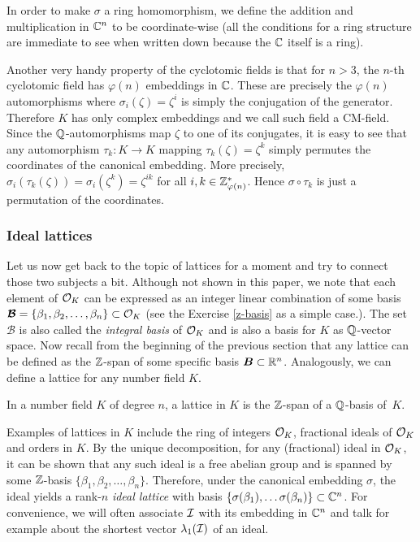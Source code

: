 In order to make $\sigma$ a ring homomorphism, we define the addition and multiplication in $\mathbb{C}^n$ to be coordinate-wise (all the conditions for a ring structure are immediate to see when written down because the $\mathbb{C}$ itself is a ring).

Another very handy property of the cyclotomic fields is that for $n > 3$, the $n$-th cyclotomic field has $\varphi(n)$ embeddings in $\mathbb{C}$. These are precisely the $\varphi(n)$ automorphisms where $\sigma_i(\zeta) = \zeta^i$ is simply the conjugation of the generator. Therefore $K$ has only complex embeddings and we call such field a CM-field. Since the $\mathbb{Q}$-automorphisms map $\zeta$ to one of its conjugates, it is easy to see that any automorphism $\tau_k : K \rightarrow K$ mapping $\tau_k(\zeta) = \zeta^k$ simply permutes the coordinates of the canonical embedding. More precisely, $\sigma_i(\tau_k(\zeta)) = \sigma_i(\zeta^k) = \zeta^{ik}$ for all $i,k \in \mathbb{Z}_{\varphi(n)}^*$. Hence $\sigma \circ \tau_k$ is just a permutation of the coordinates.

\subsubsection*{Ideal lattices}
Let us now get back to the topic of lattices for a moment and try to connect those two subjects a bit. Although not shown in this paper, we note that each element of $\mathcal{O}_K$ can be expressed as an integer linear combination of some basis $\boldsymbol{\mathcal{B}} = \{\beta_1, \beta_2, \ldots, \beta_n \} \subset \mathcal{O}_K$ (see the Exercise \ref{z-basis} as a simple case.). The set $\bm{\mathcal{B}}$ is also called the \textit{integral basis} of $\mathcal{O}_K$ and is also a basis for $K$ as $\mathbb{Q}$-vector space. Now recall from the beginning of the previous section that any lattice can be defined as the $\mathbb{Z}$-span of some specific basis $\mathcal{\boldsymbol{B}} \subset \mathbb{R}^n$. Analogously, we can define a lattice for any number field $K$.

\begin{definition}
	In a number field $K$ of degree $n$, a lattice in $K$ is the $\mathbb{Z}$-span of a $\mathbb{Q}$-basis of~$K$.
\end{definition}
Examples of lattices in $K$ include the ring of integers $\mathcal{O}_K$, fractional ideals of $\mathcal{O}_K$ and orders in $K$. By the unique decomposition, for any (fractional) ideal in $\mathcal{O}_K$, it can be shown that any such ideal is a free abelian group and is spanned by some $\mathbb{Z}$-basis $\{\beta_1, \beta_2, \ldots, \beta_n \}$. Therefore, under the canonical embedding $\sigma$, the ideal yields a rank-$n$ \textit{ideal lattice} with basis $\{\sigma(\beta_1), \ldots \sigma(\beta_n) \} \subset \mathbb{C}^n$. For convenience, we will often associate $\mathcal{I}$ with its embedding in $\mathbb{C}^n$ and talk for example about the shortest vector $\lambda_1(\mathcal{I})$ of an ideal.


